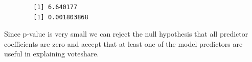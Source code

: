 \documentclass[12pt,letterpaper]{article}
\begin{document}
\begin{enumerate}
	
	\begin{verbatim}
		[1] 6.640177
		[1] 0.001803868
	\end{verbatim}
	Since p-value is very small we can reject the null hypothesis that all predictor coefficients are zero and accept that at least one of the model predictors are useful in explaining voteshare. 
	
\end{enumerate}  

	
\end{document}
